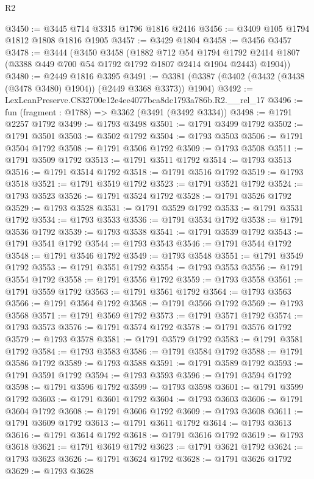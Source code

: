 \begin{lexlean}{R2}
\begin{coremodule}
@3450 := @3445 @714 @3315 @1796 @1816 @2416
@3456 := @3409 @105 @1794 @1812 @1808 @1816 @1905
@3457 := @3429 @1804
@3458 := @3456 @3457
@3478 := @3444
    (@3450
      @3458
      (@1882
        @712
        @54
        @1794
        @1792
        @2414
        @1807
        (@3388 @449 @700 @54 @1792 @1792 @1807 @2414 @1904 @2443)
        @1904))
@3480 := @2449 @1816 @3395
@3491 := @3381 (@3387 (@3402 (@3432 (@3438 (@3478 @3480) @1904)) (@2449 @3368 @3373)) @1904)
@3492 := LexLeanPreserve.C832700e12e4ee4077bca8dc1793a786b.R2.__rel_17
@3496 := fun (fragment : @1788) => @3362 (@3491 (@3492 @3334))
@3498 := @1791 @2257 @1792
@3499 := @1793 @3498
@3501 := @1791 @3499 @1792
@3502 := @1791 @3501
@3503 := @3502 @1792
@3504 := @1793 @3503
@3506 := @1791 @3504 @1792
@3508 := @1791 @3506 @1792
@3509 := @1793 @3508
@3511 := @1791 @3509 @1792
@3513 := @1791 @3511 @1792
@3514 := @1793 @3513
@3516 := @1791 @3514 @1792
@3518 := @1791 @3516 @1792
@3519 := @1793 @3518
@3521 := @1791 @3519 @1792
@3523 := @1791 @3521 @1792
@3524 := @1793 @3523
@3526 := @1791 @3524 @1792
@3528 := @1791 @3526 @1792
@3529 := @1793 @3528
@3531 := @1791 @3529 @1792
@3533 := @1791 @3531 @1792
@3534 := @1793 @3533
@3536 := @1791 @3534 @1792
@3538 := @1791 @3536 @1792
@3539 := @1793 @3538
@3541 := @1791 @3539 @1792
@3543 := @1791 @3541 @1792
@3544 := @1793 @3543
@3546 := @1791 @3544 @1792
@3548 := @1791 @3546 @1792
@3549 := @1793 @3548
@3551 := @1791 @3549 @1792
@3553 := @1791 @3551 @1792
@3554 := @1793 @3553
@3556 := @1791 @3554 @1792
@3558 := @1791 @3556 @1792
@3559 := @1793 @3558
@3561 := @1791 @3559 @1792
@3563 := @1791 @3561 @1792
@3564 := @1793 @3563
@3566 := @1791 @3564 @1792
@3568 := @1791 @3566 @1792
@3569 := @1793 @3568
@3571 := @1791 @3569 @1792
@3573 := @1791 @3571 @1792
@3574 := @1793 @3573
@3576 := @1791 @3574 @1792
@3578 := @1791 @3576 @1792
@3579 := @1793 @3578
@3581 := @1791 @3579 @1792
@3583 := @1791 @3581 @1792
@3584 := @1793 @3583
@3586 := @1791 @3584 @1792
@3588 := @1791 @3586 @1792
@3589 := @1793 @3588
@3591 := @1791 @3589 @1792
@3593 := @1791 @3591 @1792
@3594 := @1793 @3593
@3596 := @1791 @3594 @1792
@3598 := @1791 @3596 @1792
@3599 := @1793 @3598
@3601 := @1791 @3599 @1792
@3603 := @1791 @3601 @1792
@3604 := @1793 @3603
@3606 := @1791 @3604 @1792
@3608 := @1791 @3606 @1792
@3609 := @1793 @3608
@3611 := @1791 @3609 @1792
@3613 := @1791 @3611 @1792
@3614 := @1793 @3613
@3616 := @1791 @3614 @1792
@3618 := @1791 @3616 @1792
@3619 := @1793 @3618
@3621 := @1791 @3619 @1792
@3623 := @1791 @3621 @1792
@3624 := @1793 @3623
@3626 := @1791 @3624 @1792
@3628 := @1791 @3626 @1792
@3629 := @1793 @3628

\end{coremodule}
\end{lexlean}
